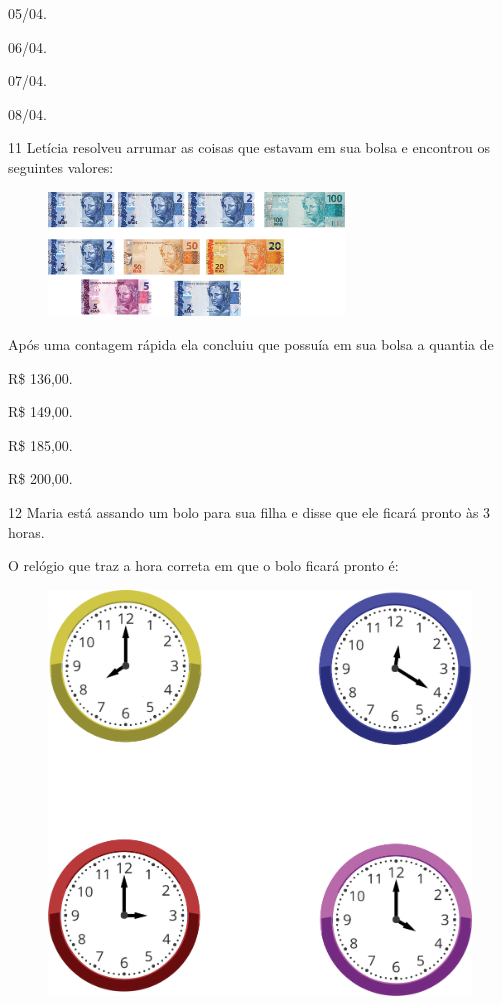\begin{multicols}{2}
\begin{escolha}
\item
  05/04.
\item
  06/04.
\item
  07/04.
\item
  08/04.
\end{escolha}
\end{multicols}

\num{11} Letícia resolveu arrumar as coisas que estavam em sua bolsa e encontrou os seguintes valores:

\begin{figure}[htpb!]
\centering
\includegraphics[width=0.7\textwidth]{./media/image110.png}
\end{figure}

Após uma contagem rápida ela concluiu que possuía em sua bolsa a quantia de

\begin{escolha}
\item
  R\$ 136,00.
\item
  R\$ 149,00.
\item
  R\$ 185,00.
\item
  R\$ 200,00.
\end{escolha}


\num{12} Maria está assando um bolo para sua filha e disse que ele ficará pronto às 3 horas.

O relógio que traz a hora correta em que o bolo ficará pronto é:

\begin{figure}[htpb!]
\centering
\includegraphics[width=.45\textwidth]{./media/image111.png}
\end{figure}

